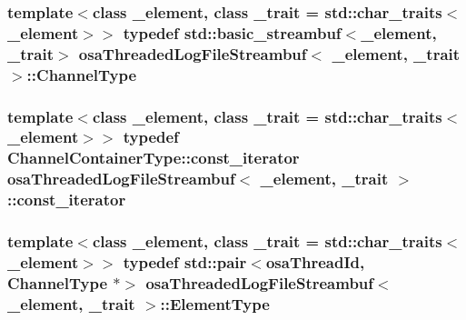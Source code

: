 \subsubsection[{Channel\+Type}]{\setlength{\rightskip}{0pt plus 5cm}template$<$class \+\_\+element, class \+\_\+trait = std\+::char\+\_\+traits$<$\+\_\+element$>$$>$ typedef std\+::basic\+\_\+streambuf$<$\+\_\+element, \+\_\+trait$>$ {\bf osa\+Threaded\+Log\+File\+Streambuf}$<$ \+\_\+element, \+\_\+trait $>$\+::{\bf Channel\+Type}}\label{classosa_threaded_log_file_streambuf_a216ca33908152519430e5456e828805f}
\hypertarget{classosa_threaded_log_file_streambuf_ae7f904ba3ba23106eb4821db7db66a26}{}
\subsubsection[{const\+\_\+iterator}]{\setlength{\rightskip}{0pt plus 5cm}template$<$class \+\_\+element, class \+\_\+trait = std\+::char\+\_\+traits$<$\+\_\+element$>$$>$ typedef Channel\+Container\+Type\+::const\+\_\+iterator {\bf osa\+Threaded\+Log\+File\+Streambuf}$<$ \+\_\+element, \+\_\+trait $>$\+::{\bf const\+\_\+iterator}}\label{classosa_threaded_log_file_streambuf_ae7f904ba3ba23106eb4821db7db66a26}
\hypertarget{classosa_threaded_log_file_streambuf_afe93c480e5a97ccc96aa3027a8c15ed5}{}
\subsubsection[{Element\+Type}]{\setlength{\rightskip}{0pt plus 5cm}template$<$class \+\_\+element, class \+\_\+trait = std\+::char\+\_\+traits$<$\+\_\+element$>$$>$ typedef std\+::pair$<${\bf osa\+Thread\+Id}, {\bf Channel\+Type} $\ast$$>$ {\bf osa\+Threaded\+Log\+File\+Streambuf}$<$ \+\_\+element, \+\_\+trait $>$\+::{\bf Element\+Type}}\label{classosa_threaded_log_file_streambuf_afe93c480e5a97ccc96aa3027a8c15ed5}
\hypertarget{classosa_threaded_log_file_streambuf_aac7f3a06c7b5f2824da9634732698e4b}{}
